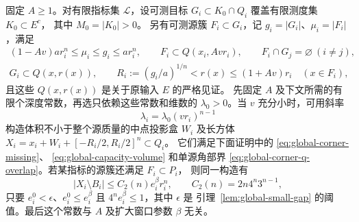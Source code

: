 \begin{lemma}[强面容量与单源角部工具]\label{lem:global-face-capacity}
固定 \(A\ge1\)。对有限指标集 \(\mathcal L\)，设可测目标
\(G_i\subset K_0\cap Q_i\) 覆盖有限测度集 \(K_0\subset E^c\)，
其中 \(M_0=|K_0|>0\)。
另有可测源簇 \(F_i\subset G_i\)，记 \(g_i=|G_i|\)、\(\mu_i=|F_i|\)，满足
\begin{gather}
 (1-Av)ar_i^n\le\mu_i\le g_i\le ar_i^n,\qquad
 F_i\subset Q(x_i,Avr_i),\qquad F_i\cap G_j=\varnothing\ (i\ne j),
 \label{eq:global-source-target}\\
 G_i\subset Q(x,r(x)),\qquad
 R_i:=(g_i/a)^{1/n}<r(x)\le(1+Av)r_i
 \quad(x\in F_i),
 \label{eq:global-source-witness}
\end{gather}
且这些 \(Q(x,r(x))\) 是关于原输入 \(E\) 的严格见证。
先固定 \(A\) 及下文所需的有限个深度常数，再选只依赖这些常数和维数的
\(\lambda_0>0\)。当 \(v\) 充分小时，可用斜率
\begin{equation}\label{eq:global-strong-cdf-slope}
 \lambda_i=\lambda_0(vr_i)^{n-1}
\end{equation}
构造体积不小于整个源质量的中点投影盒 \(W_i\) 及长方体
\(X_i=x_i+W_i+[-R_i/2,R_i/2]^n\subset Q_i\)。
它们满足下面证明中的 \eqref{eq:global-corner-missing}、
\eqref{eq:global-capacity-volume} 和单源角部界
\eqref{eq:global-corner-q-overlap}。若某指标的源簇还满足 \(F_i\subset P_i\)，
则同一构造有
\begin{equation}\label{eq:global-boundary-protrusion}
 |X_i\setminus B_i|\le C_2(n)e_i^\beta r_i^n,
 \qquad C_2(n)=2n4^n3^{n-1},
\end{equation}
只要 \(e_i^0<\epsilon\)、\(e_i^0\le e_i^\beta\) 且
\(4^ne_i^\beta\le1\)，其中 \(\epsilon\) 是
引理~\ref{lem:global-small-gap} 的阈值。最后这个常数与
\(A\) 及扩大窗口参数 \(\beta\) 无关。
\end{lemma}
